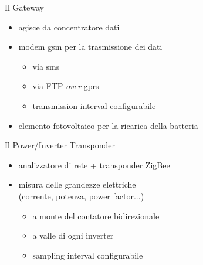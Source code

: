 \documentclass{beamer}
\newcommand{\red}[1]{\textcolor[rgb]{.8,0,0}{#1}}
\newcommand{\green}[1]{\textcolor[rgb]{0,.6,.1}{#1}}
\begin{document}
%
\begin{frame}{Il Gateway}
\begin{figure}[!h]
  \begin{center}
  \end{center}
\end{figure}
%
\begin{itemize}
  \item agisce da \red{concentratore dati}
  \item \red{modem gsm} per la trasmissione dei dati
    \begin{itemize}
    \item via \green{sms}
    \item via \green{FTP} \emph{over} \green{gprs}
    \item \red{transmission interval} configurabile
      \end{itemize}
  \item \red{elemento fotovoltaico} per la ricarica della batteria
\end{itemize}
%
\end{frame}
%

%
\begin{frame}{Il Power/Inverter Transponder}
\begin{figure}[!h]
  \begin{center}
  \end{center}
\end{figure}
%
\begin{itemize}
\item \red{analizzatore di rete} + \red{transponder ZigBee}
\item misura delle grandezze elettriche \\ (corrente, potenza, power factor...)
  \begin{itemize}
  \item a monte del contatore bidirezionale
  \item a valle di ogni inverter
  \item \red{sampling interval} configurabile
  \end{itemize}
\end{itemize}
%
\end{frame}
%
\end{document}
